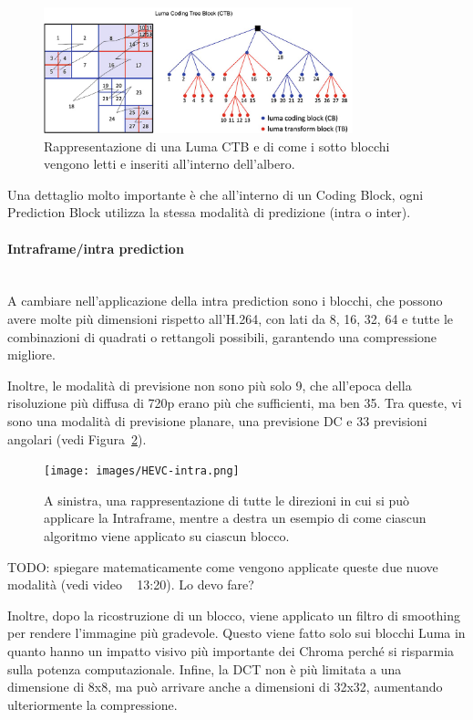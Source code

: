 \documentclass[a4paper,12pt, oneside]{article}
\begin{document}
\begin{figure}[h]
    \centering
    \includegraphics[width=0.8\textwidth]{images/chroma-CTB.png}
    \caption{Rappresentazione di una Luma CTB e di come i sotto blocchi vengono letti e inseriti
    all'interno dell'albero.}
    \label{fig:chroma_CTB}
\end{figure}

Una dettaglio molto importante è che all'interno di un Coding Block, ogni Prediction Block utilizza la
stessa modalità di predizione (intra o inter).

\paragraph{Intraframe/intra prediction}\hphantom{A}\\
A cambiare nell'applicazione della intra prediction sono i blocchi, che possono avere molte più
dimensioni rispetto all'H.264, con lati da 8, 16, 32, 64 e tutte le combinazioni di quadrati o rettangoli
possibili, garantendo una compressione migliore.

Inoltre, le modalità di previsione non sono più solo 9, che all'epoca della risoluzione più diffusa di 720p
erano più che sufficienti, ma ben 35. Tra queste, vi sono una modalità di previsione planare, una previsione DC 
e 33 previsioni angolari (vedi Figura~\ref{fig:HEVC_intra}).

\begin{figure}[h]
    \centering
    \texttt{[image: images/HEVC-intra.png]}
    \caption{A sinistra, una rappresentazione di tutte le direzioni in cui si può applicare la Intraframe,
    mentre a destra un esempio di come ciascun algoritmo viene applicato su ciascun blocco.}
    \label{fig:HEVC_intra}
\end{figure}

TODO: spiegare matematicamente come vengono applicate queste due nuove modalità (vedi video ~ 13:20). Lo devo fare?

Inoltre, dopo la ricostruzione di un blocco, viene applicato un filtro di smoothing per rendere
l'immagine più gradevole. Questo viene fatto solo sui blocchi Luma in quanto hanno un impatto visivo più
importante dei Chroma perché si risparmia sulla potenza computazionale.
Infine, la DCT non è più limitata a una dimensione di 8x8, ma può arrivare anche a dimensioni di 32x32,
aumentando ulteriormente la compressione.
\end{document}
